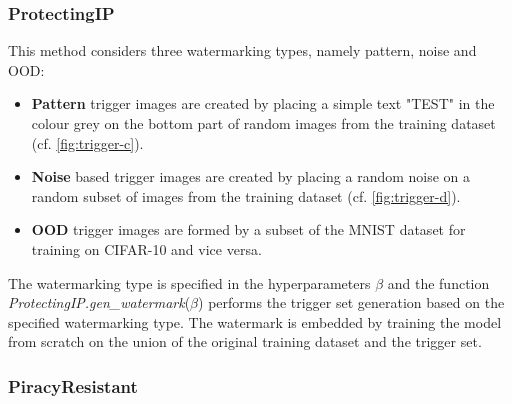 

\subsubsection{ProtectingIP} 
\label{sec:protecting}

This method considers three watermarking types, namely pattern, noise and OOD:
\begin{itemize}
    \item \textbf{Pattern} trigger images are created by placing a simple text "TEST" in the colour grey on the bottom part of random images from the training dataset (cf. \cref{fig:trigger-c}).
    \item \textbf{Noise} based trigger images are created by placing a random noise on a random subset of images from the training dataset (cf. \cref{fig:trigger-d}).
    \item \textbf{OOD} trigger images are formed by a subset of the MNIST dataset for training on CIFAR-10 and vice versa.
\end{itemize}

The watermarking type is specified in the hyperparameters $\beta$ and the function \textit{ProtectingIP.gen\_watermark}($\beta$) performs the trigger set generation based on the specified watermarking type. The watermark is embedded by training the model from scratch on the union of the original training dataset and the trigger set.


\subsubsection{PiracyResistant}
\label{sec:piracy}

